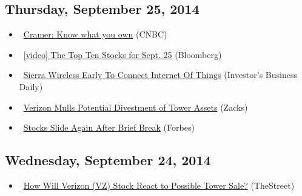 \documentclass[11pt,asymmetric]{article}
\begin{document}
\subsection*{Thursday, September 25, 2014}
\begin{itemize}
\item\ \href{http://finance.yahoo.com/video/cramer-know-own-222500067.html}{Cramer: Know what you own} (CNBC)
\item\ \href{http://www.bloomberg.com/video/bloomberg-s-top-ten-stocks-for-sept-25-ZpqfXqvTQ~S2hHri7dnYUA.html?cmpid=yhoo}{[video] The Top Ten Stocks for Sept. 25} (Bloomberg)
\item\ \href{http://news.investors.com/092514-718996-sierra-wireless-connects-internet-of-things.htm?ven=yahoocp&src=aurlled&ven=yahoo}{Sierra Wireless Early To Connect Internet Of Things} (Investor's Business Daily)
\item\ \href{http://finance.yahoo.com/news/verizon-mulls-potential-divestment-tower-175003135.html}{Verizon Mulls Potential Divestment of Tower Assets} (Zacks)
\item\ \href{http://www.forbes.com/sites/steveschaefer/2014/09/25/stocks-slide-again-after-brief-break/?partner=yahootix}{Stocks Slide Again After Brief Break} (Forbes)
\end{itemize}
\subsection*{Wednesday, September 24, 2014}
\begin{itemize}
\item\ \href{http://www.thestreet.com/story/12890373/1/how-will-verizon-vz-stock-react-to-possible-tower-sale.html?puc=yahoo&cm_ven=YAHOO}{How Will Verizon (VZ) Stock React to Possible Tower Sale?} (TheStreet)
\end{itemize}
\end{document}
